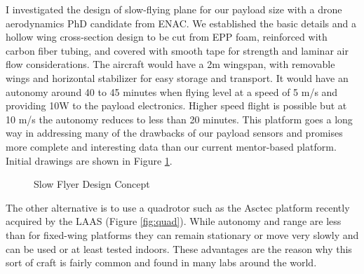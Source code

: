 \documentclass[a4paper,11pt]{report}
\begin{document}
I investigated the design of slow-flying plane for our payload size with a drone aerodynamics PhD candidate from ENAC. We established the basic details and a hollow wing cross-section design to be cut from EPP foam, reinforced with carbon fiber tubing, and covered with smooth tape for strength and laminar air flow considerations. The aircraft would have a 2m wingspan, with removable wings and horizontal stabilizer for easy storage and transport. It would have an autonomy around 40 to 45 minutes when flying level at a speed of 5 m/s and providing 10W to the payload electronics. Higher speed flight is possible but at 10 m/s the autonomy reduces to less than 20 minutes. This platform goes a long way in addressing many of the drawbacks of our payload sensors and promises more complete and interesting data than our current mentor-based platform. Initial drawings are shown in Figure \ref{fig:murat_design}.

\begin{figure}[ht]
  \centering
  \caption{Slow Flyer Design Concept}
  \label{fig:murat_design}
\end{figure} 

The other alternative is to use a quadrotor such as the Asctec platform recently acquired by the LAAS (Figure \ref{fig:quad}). While autonomy and range are less than for fixed-wing platforms they can remain stationary or move very slowly and can be used or at least tested indoors. These advantages are the reason why this sort of craft is fairly common and found in many labs around the world.
\end{document}
